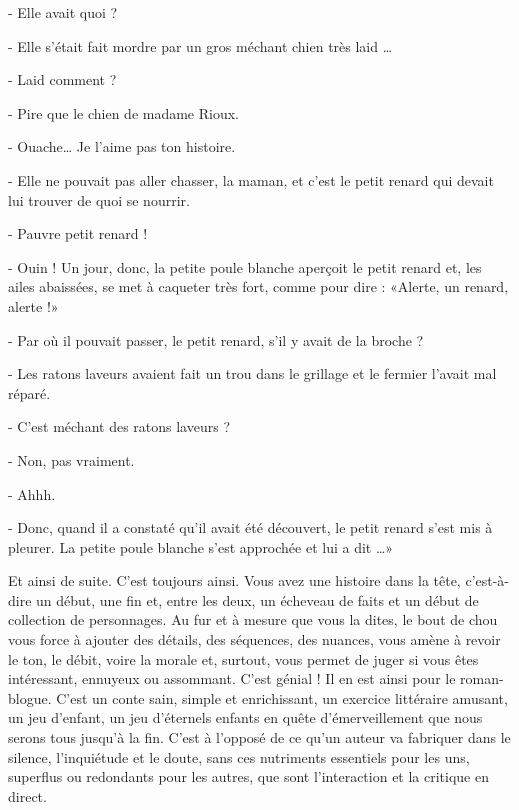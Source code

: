 \begin{Postface}
- Elle avait quoi ?

- Elle s’était fait mordre par un gros méchant chien très laid …

- Laid comment ?

- Pire que le chien de madame Rioux.

- Ouache… Je l’aime pas ton histoire.

- Elle ne pouvait pas aller chasser, la maman, et c’est le petit renard qui devait lui trouver de quoi se nourrir.

- Pauvre petit renard !

- Ouin ! Un jour, donc, la petite poule blanche aperçoit le petit renard et, les ailes abaissées, se met à caqueter très fort, comme pour dire : «Alerte, un renard, alerte !»

- Par où il pouvait passer, le petit renard, s’il y avait de la broche ?

- Les ratons laveurs avaient fait un trou dans le grillage et le fermier l’avait mal réparé.

- C’est méchant des ratons laveurs ?

- Non, pas vraiment.

- Ahhh.

- Donc, quand il a constaté qu’il avait été découvert, le petit renard s’est mis à pleurer. La petite poule blanche s’est approchée et lui a dit …»

Et ainsi de suite. C’est toujours ainsi. Vous avez une histoire dans la tête, c’est-à-dire un début, une fin et, entre les deux, un écheveau de faits et un début de collection de personnages. Au fur et à mesure que vous la dites, le bout de chou vous force à ajouter des détails, des séquences, des nuances, vous amène à revoir le ton, le débit, voire la morale et, surtout, vous permet de juger si vous êtes intéressant, ennuyeux ou assommant. C’est génial ! Il en est ainsi pour le roman-blogue. C’est un conte sain, simple et enrichissant, un exercice littéraire amusant, un jeu d’enfant, un jeu d’éternels enfants en quête d’émerveillement que nous serons tous jusqu’à la fin. C’est à l’opposé de ce qu’un auteur va fabriquer dans le silence, l’inquiétude et le doute, sans ces nutriments essentiels pour les uns, superflus ou redondants pour les autres, que sont l’interaction et la critique en direct.


\end{Postface}
